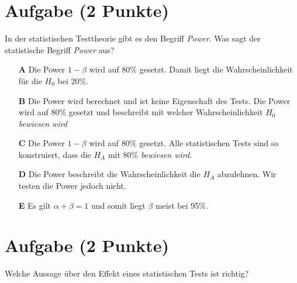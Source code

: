 \documentclass[a4paper, 9pt]{scrartcl}\usepackage[]{graphicx}\usepackage[]{xcolor}
\begin{document}
\section{Aufgabe \hfill (2 Punkte)}



In der statistischen Testtheorie gibt es den Begriff \textit{Power}. Was sagt der statistische Begriff \textit{Power} aus?



\begin{enumerate}
\item [\textbf{A} \msquare] Die Power $1-\beta$ wird auf 80\% gesetzt. Damit liegt die Wahrscheinlichkeit für die $H_0$ bei 20\%.
\item [\textbf{B} \msquare] Die Power wird berechnet und ist keine Eigenschaft des Tests. Die Power wird auf $80\%$ gesetzt und beschreibt mit welcher Wahrscheinlichkeit $H_0$ \textit{bewiesen wird}
\item [\textbf{C} \msquare] Die Power $1-\beta$ wird auf 80\% gesetzt. Alle statistischen Tests sind so konstruiert, dass die $H_A$ mit 80\% \textit{bewiesen wird}.
\item [\textbf{D} \msquare] Die Power beschreibt die Wahrscheinlichkeit die $H_A$ abzulehnen. Wir testen die Power jedoch nicht.
\item [\textbf{E} \msquare] Es gilt $\alpha + \beta = 1$ und somit liegt $\beta$ meist bei 95\%.
\end{enumerate}

\section{Aufgabe \hfill (2 Punkte)}



Welche Aussage über den Effekt eines statistischen Tests ist richtig?
\end{document}
